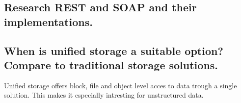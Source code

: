 \subsection{Research REST and SOAP and their implementations.} %
\label{sub:research_rest_and_soap_and_their_implementations}


\subsection{When is unified storage a suitable option? Compare to traditional storage solutions.} %
\label{sub:when_is_unified_storage_a_suitable_option_compare_to_traditional_storage_solutions}
	Unified storage offers block, file and object level acces to data
	trough a single solution.
	This makes it especially intresting for unstructured data.
